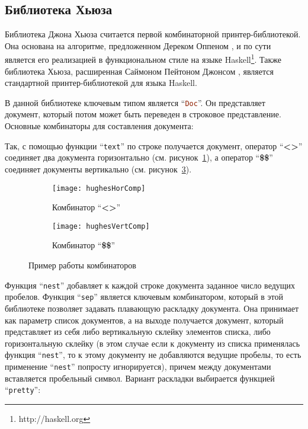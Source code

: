 \subsection{Библиотека Хьюза}

Библиотека Джона Хьюза\cite{hughes} считается первой комбинаторной принтер-библиотекой. Она основана на алгоритме, предложенном Дереком Оппеном \cite{oppen}, и по сути является его реализацией в функциональном стиле на языке Haskell\footnote{http://haskell.org}. Также библиотека Хьюза, расширенная Саймоном Пейтоном Джонсом \cite{peytonJones}, является стандартной принтер-библиотекой для языка Haskell.


В данной библиотеке ключевым типом является “\lstinline[language=Haskell]{Doc}”. Он представляет документ, который потом может быть переведен в строковое представление.
Основные комбинаторы для составления документа:


Так, с помощью функции “\lstinline[language=Haskell]{text}” по строке получается документ, оператор “\textbf{<>}” соединяет два документа горизонтально (см. рисунок~\ref{fig:hughesHorComp}), а оператор “\textbf{\$\$}” соединяет документы вертикально (см. рисунок~\ref{fig:hughesVertComp}).

\begin{figure}[ht]
	\begin{subfigure}[b]{0.45\linewidth}
		\centering
		\texttt{[image: hughesHorComp]}
		\caption{Комбинатор “\textbf{<>}”}
		\label{fig:hughesHorComp}
	\end{subfigure}
	\hspace{0.5cm}
	\begin{subfigure}[b]{0.45\linewidth}
		\centering
		\texttt{[image: hughesVertComp]}
		\caption{Комбинатор “\textbf{\$\$}”}
		\label{fig:hughesVertComp}
	\end{subfigure}

	\caption{Пример работы комбинаторов}
\end{figure}

Функция “\lstinline[language=Haskell]{nest}” добавляет к каждой строке документа заданное число ведущих пробелов. Функция “\lstinline[language=Haskell]{sep}” является ключевым комбинатором, который в этой библиотеке позволяет задавать плавающую раскладку документа. Она принимает как параметр список документов, а на выходе получается документ, который представляет из себя либо вертикальную склейку элементов списка, либо горизонтальную склейку (в этом случае если к документу из списка применялась функция “\lstinline[language=Haskell]{nest}”, то к этому документу не добавляются ведущие пробелы, то есть применение “\lstinline[language=Haskell]{nest}” попросту игнорируется), причем между документами вставляется пробельный символ. Вариант раскладки выбирается функцией “\lstinline[language=Haskell]{pretty}”:


